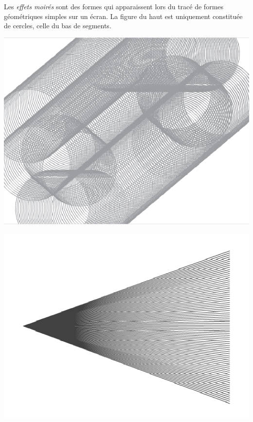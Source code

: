 \documentclass[class=report,crop=false, 12pt]{standalone}
\begin{document}
\begin{activite}

Les \emph{effets moirés} sont des formes qui apparaissent lors du tracé  de formes géométriques simples sur un écran. La figure du haut est uniquement constituée de cercles, celle du bas de segments.

\begin{center}
  \includegraphics[scale=\scaleecran,scale=0.8]{ecran-11-ex2a} 
\end{center}
\begin{center}  
  \includegraphics[scale=\scaleecran,scale=0.8]{ecran-11-ex2b}   
\end{center}


\end{activite}
\end{document}
